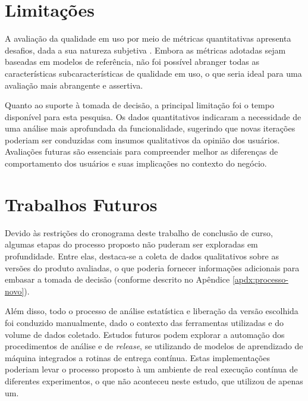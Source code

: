 \section{Limitações}

A avaliação da qualidade em uso por meio de métricas quantitativas apresenta desafios, dada a sua natureza subjetiva \cite{qatch, fabijan_three_2019}. Embora as métricas adotadas sejam baseadas em modelos de referência, não foi possível abranger todas as características subcaracterísticas de qualidade em uso, o que seria ideal para uma avaliação mais abrangente e assertiva.

Quanto ao suporte à tomada de decisão, a principal limitação foi o tempo disponível para esta pesquisa. Os dados quantitativos indicaram a necessidade de uma análise mais aprofundada da funcionalidade, sugerindo que novas iterações poderiam ser conduzidas com insumos qualitativos da opinião dos usuários. Avaliações futuras são essenciais para compreender melhor as diferenças de comportamento dos usuários e suas implicações no contexto do negócio.

\section{Trabalhos Futuros}

Devido às restrições do cronograma deste trabalho de conclusão de curso, algumas etapas do processo proposto não puderam ser exploradas em profundidade. Entre elas, destaca-se a coleta de dados qualitativos sobre as versões do produto avaliadas, o que poderia fornecer informações adicionais para embasar a tomada de decisão (conforme descrito no Apêndice \ref{apdx:processo-novo}).

Além disso, todo o processo de análise estatística e liberação da versão escolhida foi conduzido manualmente, dado o contexto das ferramentas utilizadas e do volume de dados coletado. Estudos futuros podem explorar a automação dos procedimentos de análise e de \textit{release}, se utilizando de modelos de aprendizado de máquina integrados a rotinas de entrega contínua. Estas implementações poderiam levar o processo proposto à um ambiente de real execução contínua de diferentes experimentos, o que não aconteceu neste estudo, que utilizou de apenas um.
